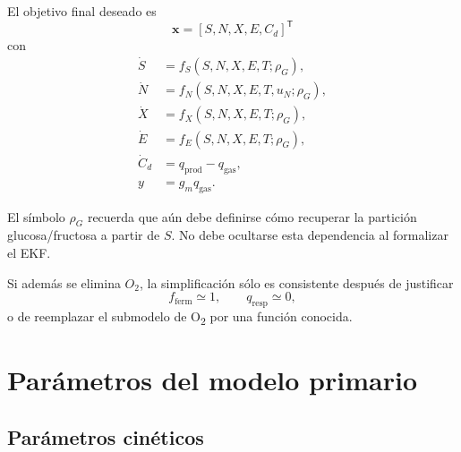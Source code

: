 \documentclass[11pt,a4paper]{article}
\begin{document}
El objetivo final deseado es
\begin{equation}
\boxed{
\mathbf{x}=
[S,N,X,E,C_d]^\mathsf{T}
}
\end{equation}
con
\begin{equation}
\boxed{
\begin{aligned}
\dot S &= f_S(S,N,X,E,T;\rho_G),\\
\dot N &= f_N(S,N,X,E,T,u_N;\rho_G),\\
\dot X &= f_X(S,N,X,E,T;\rho_G),\\
\dot E &= f_E(S,N,X,E,T;\rho_G),\\
\dot C_d &= q_{\mathrm{prod}}-q_{\mathrm{gas}},\\
y &= g_m q_{\mathrm{gas}}.
\end{aligned}
}
\label{eq:reduced_compact}
\end{equation}

El símbolo $\rho_G$ recuerda que aún debe definirse cómo recuperar la partición glucosa/fructosa
a partir de $S$. No debe ocultarse esta dependencia al formalizar el EKF.

Si además se elimina $O_2$, la simplificación sólo es consistente después de justificar
\[
f_{\mathrm{ferm}}\simeq 1,
\qquad
q_{\mathrm{resp}}\simeq 0,
\]
o de reemplazar el submodelo de O\textsubscript{2} por una función conocida.

\section{Parámetros del modelo primario}

\subsection{Parámetros cinéticos}
\end{document}

